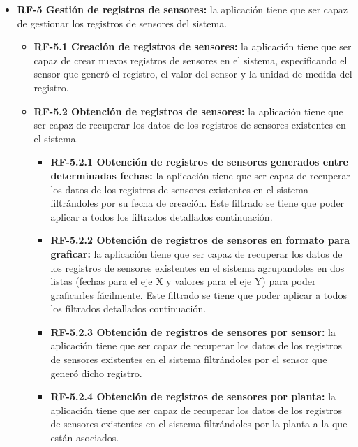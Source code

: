 \begin{itemize}
        
        \item \textbf{RF-5 Gestión de registros de sensores:} la aplicación tiene que ser capaz de gestionar los registros de sensores del sistema.
            \begin{itemize}
                \item \textbf{RF-5.1 Creación de registros de sensores:} la aplicación tiene que ser capaz de crear nuevos registros de sensores en el sistema, especificando el sensor que generó el registro,  el valor del sensor y la unidad de medida del registro.
                \item \textbf{RF-5.2 Obtención de registros de sensores:} la aplicación tiene que ser capaz de recuperar los datos de los registros de sensores existentes en el sistema.
                \begin{itemize}
                    \item \textbf{RF-5.2.1 Obtención de registros de sensores generados entre determinadas fechas:} la aplicación tiene que ser capaz de recuperar los datos de los registros de sensores existentes en el sistema filtrándoles por su fecha de creación. Este filtrado se tiene que poder aplicar a todos los filtrados detallados continuación. 
    				\item \textbf{RF-5.2.2 Obtención de registros de sensores en formato para graficar:} la aplicación tiene que ser capaz de recuperar los datos de los registros de sensores existentes en el sistema agrupandoles en dos listas (fechas para el eje X y valores para el eje Y) para poder graficarles fácilmente. Este filtrado se tiene que poder aplicar a todos los filtrados detallados continuación. 
                    \item \textbf{RF-5.2.3 Obtención de registros de sensores por sensor:} la aplicación tiene que ser capaz de recuperar los datos de los registros de sensores existentes en el sistema filtrándoles por el sensor que generó dicho registro.
                    \item \textbf{RF-5.2.4 Obtención de registros de sensores por planta:} la aplicación tiene que ser capaz de recuperar los datos de los registros de sensores existentes en el sistema filtrándoles por la planta a la que están asociados.
                \end{itemize}
            \end{itemize}
            

\end{itemize}
